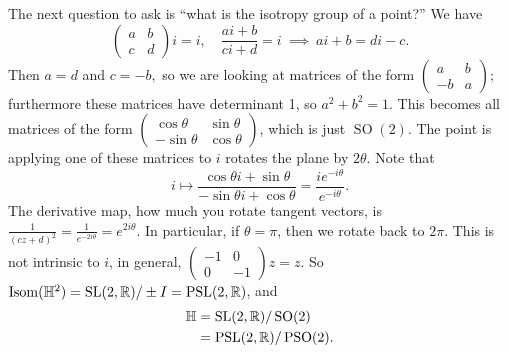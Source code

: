 The next question to ask is ``what is the isotropy group of a point?'' We have \[
\begin{pmatrix}
    a & b \\ c & d
\end{pmatrix}i=i,\quad \frac{ai+b}{ci+d}=i\ \implies \ ai+b=di-c.
\] Then $a=d$ and $c=-b,$ so we are looking at matrices of the form $\left( 
\begin{smallmatrix}
    a & b \\ -b & a
\end{smallmatrix}\right) $; furthermore these matrices have determinant 1, so $a^2+b^2=1$. This becomes all matrices of the form $\left( 
\begin{smallmatrix}
    \cos \theta & \sin \theta \\ -\sin \theta & \cos \theta
\end{smallmatrix}\right) $, which is just $\operatorname{SO}(2)$. The point is applying one of these matrices to $i$ rotates the plane by $2 \theta$. Note that \[
i \mapsto \frac{\cos \theta i + \sin \theta}{-\sin \theta i + \cos \theta}=\frac{ie^{-i \theta}}{e^{-i \theta}}.
\] The derivative map, how much you rotate tangent vectors, is $\frac{1}{(cz+d)^2}=\frac{1}{e^{-2i \theta}}=e^{2i \theta}$. In particular, if $\theta=\pi$, then we rotate back to $2\pi$. This is not intrinsic to $i$, in general, $\left( 
\begin{smallmatrix}
    -1 & 0 \\ 0 & -1
\end{smallmatrix}\right) z=z$. So $\operatorname{Isom}(\mathbb{H}^2)=\operatorname{SL}(2,\mathbb{R}) / \pm I=\operatorname{PSL}(2,\mathbb{R})$, and
\begin{align*}
    \mathbb{H} &= \operatorname{SL}(2,\mathbb{R}) / \operatorname{SO}(2) \\
       &=\operatorname{PSL}(2,\mathbb{R}) / \operatorname{PSO}(2).
\end{align*}

